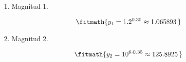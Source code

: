 \begin{enumerate}

\item Magnitud 1.

\[\fitmath{y_{1}={1.2}^{0.35}\approx 1.065893\,}\]

\item Magnitud 2.

\[\fitmath{y_{2}={10}^{6\cdot 0.35}\approx 125.8925\,}\]

\end{enumerate}
